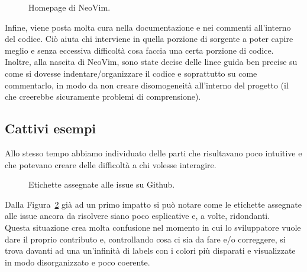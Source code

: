 \documentclass[12pt]{article} %
\begin{document}
\begin{figure}[H]
\caption{Homepage di NeoVim.}
\label{fig:buonesempio3}
\end{figure}

Infine, viene posta molta cura nella documentazione e nei commenti all'interno del codice. Ci\`o aiuta chi interviene in quella porzione di sorgente a poter capire meglio e senza eccessiva difficolt\`a cosa faccia una certa porzione di codice.\\
Inoltre, alla nascita di NeoVim, sono state decise delle linee guida ben precise su come si dovesse indentare/organizzare il codice e soprattutto su come commentarlo, in modo da non creare disomogeneit\`a all'interno del progetto (il che creerebbe sicuramente problemi di comprensione).\\

\subsection{Cattivi esempi}
\label{badexamples}
Allo stesso tempo abbiamo individuato delle parti che risultavano poco intuitive e che potevano creare delle difficolt\`a a chi volesse interagire.

\begin{figure}[H]
\caption{Etichette assegnate alle issue su Github.}
\label{fig:cattivoesempio1}
\end{figure}

Dalla Figura~\ref{fig:cattivoesempio1} gi\`a ad un primo impatto si pu\`o notare come le etichette assegnate alle issue ancora da risolvere siano poco esplicative e, a volte, ridondanti.\\
Questa situazione crea molta confusione nel momento in cui lo sviluppatore vuole dare il proprio contributo e, controllando cosa ci sia da fare e/o correggere, si trova davanti ad una un'infinit\`a di labels con i colori pi\`u disparati e visualizzate in modo disorganizzato e poco coerente.
\end{document}
